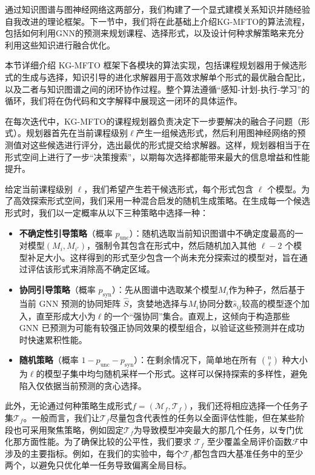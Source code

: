 \documentclass[../main.tex]{subfiles}
\begin{document}
通过知识图谱与图神经网络这两部分，我们构建了一个显式建模关系知识并随经验自我改进的理论框架。下一节中，我们将在此基础上介绍KG-MFTO的算法流程，包括如何利用GNN的预测来规划课程、选择形式，以及设计何种求解策略来充分利用这些知识进行融合优化。


本节详细介绍 KG-MFTO 框架下各模块的算法实现，包括课程规划器用于候选形式的生成与选择，知识引导的进化求解器用于高效求解单个形式的最优融合配比，以及二者与知识图谱之间的闭环协作过程。整个算法遵循“感知-计划-执行-学习”的循环，我们将在伪代码和文字解释中展现这一闭环的具体运作。

在每次迭代中，KG-MFTO的课程规划器负责决定下一步要解决的融合子问题（形式）。规划器首先在当前课程级别$\ell$产生一组候选形式，然后利用图神经网络的预测值对这些候选进行评分，选出最优的形式提交给求解器。这样，规划器相当于在形式空间上进行了一步“决策搜索”，以期每次选择都能带来最大的信息增益和性能提升。


给定当前课程级别 $\ell$，我们希望产生若干候选形式，每个形式包含 $\ell$ 个模型。为了高效探索形式空间，我们采用一种混合启发的随机生成策略。在生成每一个候选形式时，我们以一定概率从以下三种策略中选择一种：

\begin{itemize}[leftmargin=3\ccwd]
	\item \textbf{不确定性引导策略}（概率 $p_{\text{unc}}$）：随机选取当前知识图谱中不确定度最高的一对模型$(M_i, M_{i'})$，强制令其包含在形式中，然后随机加入其他 $\ell-2$ 个模型补足大小。这样得到的形式至少包含一个尚未充分探索过的模型对，旨在通过评估该形式来消除高不确定区域。
	\item \textbf{协同引导策略}（概率 $p_{\text{syn}}$）：先从图谱中选取某个模型$M_i$作为种子，然后基于当前 GNN 预测的协同矩阵 $\hat{S}$，贪婪地选择与$M_i$协同分数$\hat{s}_{ij}$较高的模型逐个加入，直至形成大小为$\ell$的一个“强协同”集合。直观上，这倾向于构造那些 GNN 已预测为可能有较强正协同效果的模型组合，以验证这些预测并在成功时快速累积性能。
	\item \textbf{随机策略}（概率 $1 - p_{\text{unc}} - p_{\text{syn}}$）：在剩余情况下，简单地在所有 $\binom{n}{\ell}$ 种大小为$\ell$的模型子集中均匀随机采样一个形式。这样可以保持探索的多样性，避免陷入仅依据当前预测的贪心选择。
\end{itemize}

此外，无论通过何种策略生成形式$f=(\mathcal{M}_f,\mathcal{T}_f)$，我们还将相应选择一个任务子集$\mathcal{T}_f$。一般而言，我们让$\mathcal{T}_f$尽量包含代表性的任务以全面评估性能，但在某些阶段也可采用聚焦策略，例如固定$\mathcal{T}_f$为导致模型冲突最大的那几个任务，以专门优化那方面性能。为了确保比较的公平性，我们要求 $\mathcal{T}_f$ 至少覆盖全局评价函数$\mathcal{F}$中涉及的主要指标。例如，在我们的实验中，每个$\mathcal{T}_f$都包含四大基准任务中的至少两个，以避免只优化单一任务导致偏离全局目标。
\end{document}
